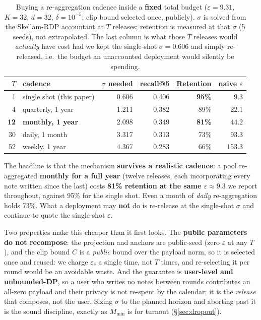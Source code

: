 \documentclass[pdflatex,sn-mathphys-num,12pt]{sn-jnl}
\theoremstyle{thmstyleone}%
\theoremstyle{thmstyletwo}%
\theoremstyle{thmstylethree}%
\newcommand{\eps}{\varepsilon}
\newcommand{\secref}[1]{\S\ref{#1}}
\begin{document}
\begin{table}[t]
  \centering
  \caption{Buying a re-aggregation cadence inside a \textbf{fixed} total budget
  ($\eps = 9.31$, $K = 32$, $d = 32$, $\delta = 10^{-5}$; clip bound selected once,
  publicly). $\sigma$ is solved from the Skellam-RDP accountant at $T$ releases;
  retention is measured at that $\sigma$ (5 seeds), not extrapolated. The last column is
  what those $T$ releases would \emph{actually} have cost had we kept the single-shot
  $\sigma = 0.606$ and simply re-released, i.e.\ the budget an unaccounted deployment
  would silently be spending.}
  \label{tab:multiround}
  \begin{tabular}{@{}rlrrrr@{}}
    \toprule
    $T$ & cadence & $\sigma$ needed & recall@5 & Retention & naive $\eps$ \\
    \midrule
    1  & single shot (this paper) & 0.606 & 0.406 & \textbf{95\%} & 9.3 \\
    4  & quarterly, 1 year        & 1.211 & 0.382 & 89\% & 22.1 \\
    \textbf{12} & \textbf{monthly, 1 year} & 2.098 & 0.349 & \textbf{81\%} & 44.2 \\
    30 & daily, 1 month           & 3.317 & 0.313 & 73\% & 93.3 \\
    52 & weekly, 1 year           & 4.367 & 0.283 & 66\% & 153.3 \\
    \bottomrule
  \end{tabular}
\end{table}

The headline is that the mechanism \textbf{survives a realistic cadence}: a pool
re-aggregated \textbf{monthly for a full year} (twelve releases, each incorporating
every note written since the last) costs \textbf{81\% retention at the same
$\eps \approx 9.3$} we report throughout, against 95\% for the single shot. Even a
month of \emph{daily} re-aggregation holds 73\%. What a deployment may \textbf{not} do
is re-release at the single-shot $\sigma$ and continue to quote the single-shot $\eps$.

Two properties make this cheaper than it first looks. The \textbf{public parameters do
not recompose}: the projection and anchors are public-seed (zero $\eps$ at any $T$), and
the clip bound $C$ is a \emph{public} bound over the payload norm, so it is selected once
and reused: we charge $\eps_c$ a single time, not $T$ times, and re-selecting it per
round would be an avoidable waste. And the guarantee is \textbf{user-level and
unbounded-DP}, so a user who writes no notes between rounds contributes an all-zero
payload and their privacy is not re-spent by the calendar; it is the \emph{release} that
composes, not the user. Sizing $\sigma$ to the planned horizon and aborting past it is
the sound discipline, exactly as $M_{\min}$ is for turnout (\secref{sec:dropout}).
\end{document}
